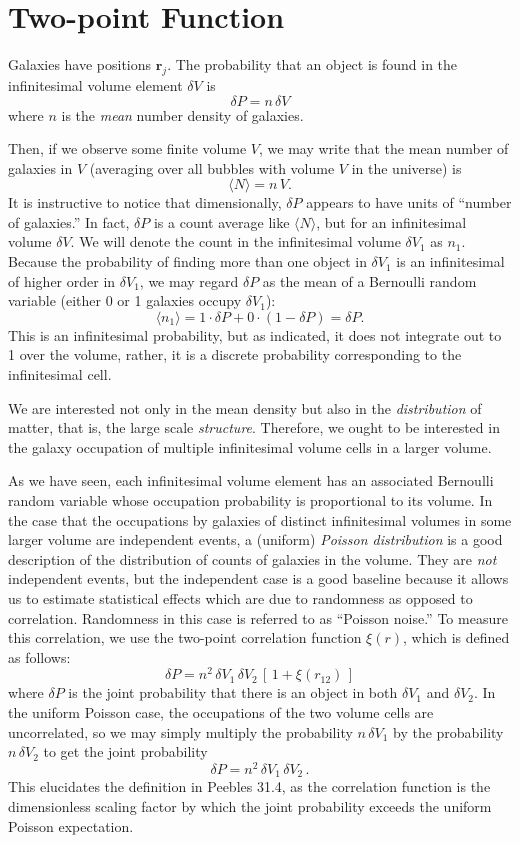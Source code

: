 \documentclass{article}
\begin{document}
\section{Two-point Function}
Galaxies have positions $\mathbf{r}_j$. 
The probability that an object is found in the infinitesimal volume element $\delta V$ is
\[
\delta P=n\,\delta V \tag{Peebles 31.1}
\]
where $n$ is the \textit{mean} number density of galaxies.

Then, if we observe some finite volume $V$, we may write that the mean number of galaxies in $V$ (averaging over all bubbles with volume $V$ in the universe) is 
\[
\langle N\rangle=n\,V. \tag{Peebles 31.3}
\]
It is instructive to notice that dimensionally, $\delta P$ appears to have units of \enquote{number of galaxies.}
In fact, $\delta P$ is a count average like $\langle N\rangle$, but for an infinitesimal volume $\delta V$. 
We will denote the count in the infinitesimal volume $\delta V_1$ as $n_1$.
Because the probability of finding more than one object in $\delta V_1$ is an infinitesimal of higher order in $\delta V_1$, we may regard $\delta P$ as the mean of a Bernoulli random variable (either 0 or 1 galaxies occupy $\delta V_1$):
\[
\langle n_1\rangle =1\cdot \delta P+0\cdot (1-\delta P)=\delta P.
\]
This is an infinitesimal probability, but as indicated, it does not integrate out to 1 over the volume, rather, it is a discrete probability corresponding to the infinitesimal cell.

We are interested not only in the mean density but also in the \textit{distribution} of matter, that is, the large scale \textit{structure}. 
Therefore, we ought to be interested in the galaxy occupation of multiple infinitesimal volume cells in a larger volume.

As we have seen, each infinitesimal volume element has an associated Bernoulli random variable whose occupation probability is proportional to its volume. In the case that the occupations by galaxies of distinct infinitesimal volumes in some larger volume are independent events, a (uniform) \textit{Poisson distribution} is a good description of the distribution of counts of galaxies in the volume.
They are \textit{not} independent events, but the independent case is a good baseline because it allows us to estimate statistical effects which are due to randomness as opposed to correlation.
Randomness in this case is referred to as \enquote{Poisson noise.}
To measure this correlation, we use the two-point correlation function $\xi(r)$, which is defined as follows:
\[
\delta P=n^2\,\delta V_1\,\delta V_2\,[\,1+\xi(r_{12})\,] \tag{Peebles 31.4}
\]
where $\delta P$ is the joint probability that there is an object in both $\delta V_1$ and $\delta V_2$. 
In the uniform Poisson case, the occupations of the two volume cells are uncorrelated, so we may simply multiply the probability $n\,\delta V_1$ by the probability $n\,\delta V_2$ to get the joint probability
\[
\delta P=n^2\,\delta V_1\,\delta V_2\, \tag{Peebles 31.5}.
\]
This elucidates the definition in Peebles 31.4, as the correlation function is the dimensionless scaling factor by which the joint probability exceeds the uniform Poisson expectation.
\end{document}
